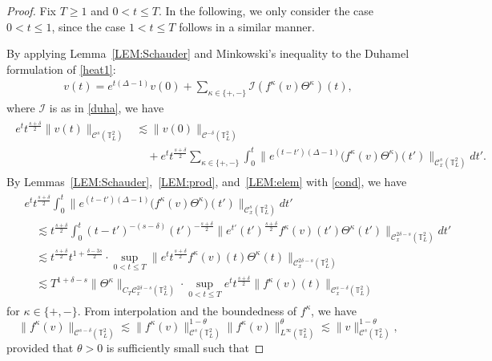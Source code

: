 \documentclass[letterpaper, 11pt,  reqno]{amsart}
\theoremstyle{myremark}
\newcommand{\Ta}{\Theta}
\newcommand{\1}{\hspace{0.5mm}\text{I}\hspace{0.5mm}}
\newcommand{\I}{\mathcal{I}}
\newcommand{\T}{\mathbb{T}}
\newcommand{\CC}{\mathcal{C}}
\newcommand{\dl}{\delta}
\newcommand{\Dl}{\Delta}
\newcommand{\kk}{\kappa}
\newcommand{\ta}{\theta}
\newcommand{\les}{\lesssim}
\numberwithin{equation}{section}
\numberwithin{theorem}{section}
\begin{document}
\begin{proof}%
Fix $T\ge 1$ and $0 < t \le T$. 
In the following, we only consider the case  $0 < t \le 1$, 
since the case $1 < t \le T$ follows in a similar manner.


By applying Lemma~\ref{LEM:Schauder} and Minkowski's inequality
to the Duhamel formulation of \eqref{heat1}:
\begin{align}
v(t) = e^{t (\Dl - 1)}v(0)  + \sum_{\kk \in \{+, -\}}\I ( f^\kk(v) \Ta^\kk )(t), 
\label{X0a}
\end{align}
where $\I$ is as in \eqref{duha}, 
we have
\begin{align}
\begin{split}
  e^t t^{\frac{s+\dl}{2}}\| v(t) \|_{\CC^s(\T^2_L)}
&    \les \|v(0)\|_{\CC^{-\dl}(\T^2_L)} \\
& \quad  + e^t t^{\frac{s+\dl}{2}}
\sum_{\kk \in \{+, -\}}
\int_0^t \big\| e^{(t-t')(\Dl - 1)} \big(f^\kk(v) \Ta^\kk\big)(t') \big\|_{\CC_x^s(\T^2_L)} dt'.
\end{split}
\label{X1}
\end{align}
By Lemmas~\ref{LEM:Schauder},~\ref{LEM:prod}, and~\ref{LEM:elem}
with \eqref{cond}, we have
\begin{align}
\begin{split}
& e^t t^{\frac{s+\dl}{2}} \int_0^t \big\| e^{(t-t')(\Dl - 1)} \big(f^\kk(v) \Ta^\kk\big) (t')\big\|_{\CC_x^s(\T^2_L)} dt'\\
&  \quad \les t^{\frac{s+\dl}{2}} \int_0^t (t-t')^{-(s-\dl)} (t')^{-\frac{s+\dl}{2}} \| e^{t'} (t')^{\frac{s+\dl}{2}} f^\kk (v)(t') \Ta^\kk(t') \|_{\CC_x^{2\dl-s}(\T^2_L)} dt' \\
&  \quad \les  t^{\frac{s+\dl}{2}} t^{1 + \frac{\dl-3s}{2}} \cdot \sup_{0< t \le T} \| e^{t} t^{\frac{s+\dl}{2}} f^\kk (v)(t) \Ta^\kk(t) \|_{\CC_x^{2\dl-s}(\T^2_L)} \\
&  \quad \les T^{1+ \dl-s}  \| \Ta^\kk \|_{C_T\CC_x^{2\dl-s}(\T^2_L)} \cdot \sup_{0< t \le T} e^{t} t^{\frac{s+\dl}{2}} \|  f^\kk (v)(t) \|_{\CC_x^{s-\dl}(\T^2_L)}
\end{split}
\label{X2}
\end{align}
for $\kk \in \{+, -\}$.
From  interpolation and the boundedness of $f^\kk$, we have 
\begin{equation}
\|f^\kk(v)\|_{\CC^{s-\dl}(\T^2_L)} 
 \les \|f^\kk(v)\|_{\CC^s(\T^2_L)}^{1-\ta}
\|f^\kk(v)\|_{L^\infty(\T^2_L)}^{\ta}
\les \|v\|^{1-\ta}_{\CC^{s}(\T^2_L)},
\label{X3}
\end{equation}
provided that  $\ta >0$ is sufficiently small such that 

\end{proof}
\end{document}
